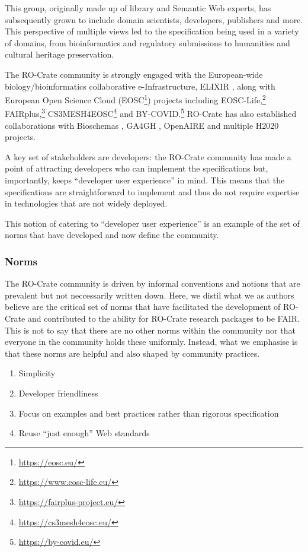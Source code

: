 \documentclass[ds,v1.1.2,openaccess]{iosart2x}%
\begin{document}
This group, originally made up of library and Semantic Web experts, has
subsequently grown to include domain scientists, developers, publishers
and more. This perspective of multiple views led to the specification
being used in a variety of domains, from bioinformatics and regulatory
submissions to humanities and cultural heritage preservation.

The RO-Crate community is strongly engaged with the European-wide
biology/bioinformatics collaborative e-Infrastructure, ELIXIR
\cite{doi:10.1016/j.tibtech.2012.02.002}, along with European Open Science
Cloud (EOSC\footnote{\url{https://eosc.eu/}}) projects including
EOSC-Life,\footnote{\url{https://www.eosc-life.eu/}}
FAIRplus,\footnote{\url{https://fairplus-project.eu/}}
CS3MESH4EOSC\footnote{\url{https://cs3mesh4eosc.eu/}} and
BY-COVID.\footnote{\url{https://by-covid.eu/}} RO-Crate has also established
collaborations with Bioschemas \cite{bioschemas_2017}, GA4GH
\cite{doi:10.1016/j.xgen.2021.100029}, OpenAIRE \cite{rettberg_2015_openaire}
and multiple H2020 projects.

A key set of stakeholders are developers: the RO-Crate community has
made a point of attracting developers who can implement the
specifications but, importantly, keeps ``developer user experience'' in
mind. This means that the specifications are straightforward to
implement and thus do not require expertise in technologies that are
not widely deployed.

This notion of catering to ``developer user experience'' is an example
of the set of norms that have developed and now define the community.

\subsubsection{Norms}

The RO-Crate community is driven by informal conventions and notions
that are prevalent but not neccessarily written down. Here, we distil
what we as authors believe are the critical set of norms that have
facilitated the development of RO-Crate and contributed to the ability
for RO-Crate research packages to be FAIR. This is not to say that
there are no other norms within the community nor that everyone in the
community holds these uniformly. Instead, what we emphasise is that
these norms are helpful and also shaped by community practices.
\begin{enumerate}
\item[1.] Simplicity
\item[2.] Developer friendliness
\item[3.] Focus on examples and best practices rather than rigorous specification
\item[4.] Reuse ``just enough'' Web standards
\end{enumerate}
\end{document}
